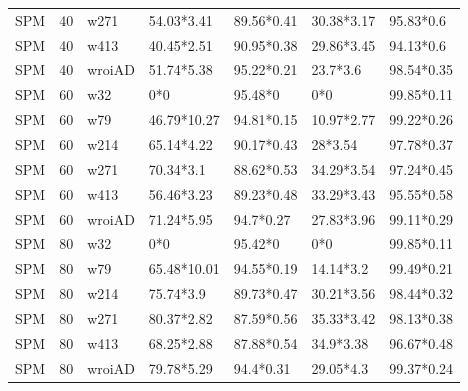 \begin{table}[ht]
\begin{tabular}{lllllll}
  SPM & 40 & w271 & 54.03*3.41 & 89.56*0.41 & 30.38*3.17 & 95.83*0.6 \\ 
  SPM & 40 & w413 & 40.45*2.51 & 90.95*0.38 & 29.86*3.45 & 94.13*0.6 \\ 
  SPM & 40 & wroiAD & 51.74*5.38 & 95.22*0.21 & 23.7*3.6 & 98.54*0.35 \\ 
  SPM & 60 & w32 & 0*0 & 95.48*0 & 0*0 & 99.85*0.11 \\ 
  SPM & 60 & w79 & 46.79*10.27 & 94.81*0.15 & 10.97*2.77 & 99.22*0.26 \\ 
  SPM & 60 & w214 & 65.14*4.22 & 90.17*0.43 & 28*3.54 & 97.78*0.37 \\ 
  SPM & 60 & w271 & 70.34*3.1 & 88.62*0.53 & 34.29*3.54 & 97.24*0.45 \\ 
  SPM & 60 & w413 & 56.46*3.23 & 89.23*0.48 & 33.29*3.43 & 95.55*0.58 \\ 
  SPM & 60 & wroiAD & 71.24*5.95 & 94.7*0.27 & 27.83*3.96 & 99.11*0.29 \\ 
  SPM & 80 & w32 & 0*0 & 95.42*0 & 0*0 & 99.85*0.11 \\ 
  SPM & 80 & w79 & 65.48*10.01 & 94.55*0.19 & 14.14*3.2 & 99.49*0.21 \\ 
  SPM & 80 & w214 & 75.74*3.9 & 89.73*0.47 & 30.21*3.56 & 98.44*0.32 \\ 
  SPM & 80 & w271 & 80.37*2.82 & 87.59*0.56 & 35.33*3.42 & 98.13*0.38 \\ 
  SPM & 80 & w413 & 68.25*2.88 & 87.88*0.54 & 34.9*3.38 & 96.67*0.48 \\ 
  SPM & 80 & wroiAD & 79.78*5.29 & 94.4*0.31 & 29.05*4.3 & 99.37*0.24 \\ 
   \hline
\end{tabular}
\end{table}
